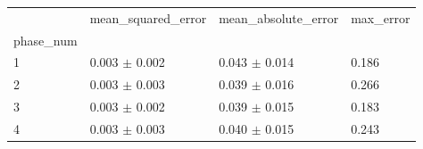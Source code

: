 \begin{tabular}{llll}
\toprule
 & mean_squared_error & mean_absolute_error & max_error \\
phase_num &  &  &  \\
\midrule
1 & 0.003 $\pm$ 0.002 & 0.043 $\pm$ 0.014 & 0.186 \\
2 & 0.003 $\pm$ 0.003 & 0.039 $\pm$ 0.016 & 0.266 \\
3 & 0.003 $\pm$ 0.002 & 0.039 $\pm$ 0.015 & 0.183 \\
4 & 0.003 $\pm$ 0.003 & 0.040 $\pm$ 0.015 & 0.243 \\
\bottomrule
\end{tabular}
